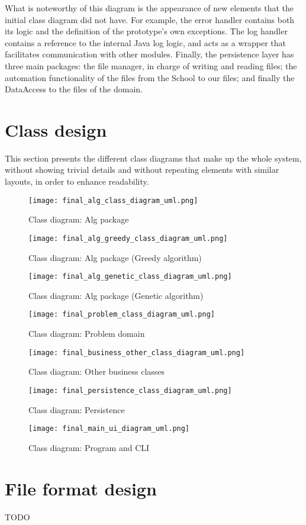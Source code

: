 What is noteworthy of this diagram is the appearance of new elements that the initial class diagram did not have. For example, the error handler contains both its logic and the definition of the prototype's own exceptions. The log handler contains a reference to the internal Java log logic, and acts as a wrapper that facilitates communication with other modules. Finally, the persistence layer has three main packages: the file manager, in charge of writing and reading files; the automation functionality of the files from the School to our files; and finally the DataAccess to the files of the domain.




\section{Class design}

This section presents the different class diagrams that make up the whole system, without showing trivial details and without repeating elements with similar layouts, in order to enhance readability.


\begin{figure}[H]
    \caption{Class diagram: Alg package}
  \centering
  \texttt{[image: final\_alg\_class\_diagram\_uml.png]}
\end{figure}

\begin{figure}[H]
    \caption{Class diagram: Alg package (Greedy algorithm)}
  \centering
  \texttt{[image: final\_alg\_greedy\_class\_diagram\_uml.png]}
\end{figure}

\begin{figure}[H]
    \caption{Class diagram: Alg package (Genetic algorithm)}
  \centering
  \texttt{[image: final\_alg\_genetic\_class\_diagram\_uml.png]}
\end{figure}

\begin{figure}[H]
    \caption{Class diagram: Problem domain}
  \centering
  \texttt{[image: final\_problem\_class\_diagram\_uml.png]}
\end{figure}

\begin{figure}[H]
    \caption{Class diagram: Other business classes}
  \centering
  \texttt{[image: final\_business\_other\_class\_diagram\_uml.png]}
\end{figure}

\begin{figure}[H]
    \caption{Class diagram: Persistence}
  \centering
  \texttt{[image: final\_persistence\_class\_diagram\_uml.png]}
\end{figure}

\begin{figure}[H]
    \caption{Class diagram: Program and CLI}
  \centering
  \texttt{[image: final\_main\_ui\_diagram\_uml.png]}
\end{figure}


\section{File format design}

TODO

